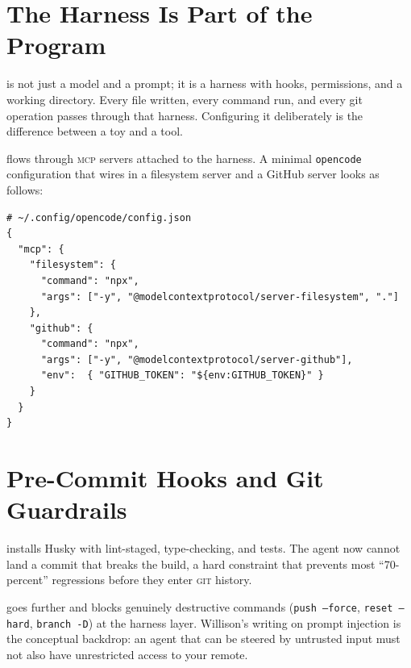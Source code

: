 \documentclass{../sharedAssets/tufte}
\begin{document}
\section{The Harness Is Part of the Program}
\label{sec:harness}

 is not just a model and a prompt; it
is a harness with hooks, permissions, and a working directory. Every
file written, every command run, and every git operation passes through
that harness. Configuring it deliberately is the difference between a
toy and a tool.

 flows through \textsc{mcp} servers attached to
the harness. A minimal \texttt{opencode} configuration that wires in a
filesystem server and a GitHub server looks as follows:

\begin{fullwidth}
\begin{verbatim}
# ~/.config/opencode/config.json
{
  "mcp": {
    "filesystem": {
      "command": "npx",
      "args": ["-y", "@modelcontextprotocol/server-filesystem", "."]
    },
    "github": {
      "command": "npx",
      "args": ["-y", "@modelcontextprotocol/server-github"],
      "env":  { "GITHUB_TOKEN": "${env:GITHUB_TOKEN}" }
    }
  }
}
\end{verbatim}
\end{fullwidth}


\section{Pre-Commit Hooks and Git Guardrails}
\label{sec:guardrails}

 installs Husky with lint-staged,
type-checking, and tests. The agent now cannot land a commit that
breaks the build, a hard constraint that prevents most ``70-percent''
regressions before they enter \textsc{git} history.

 goes further and blocks
genuinely destructive commands (\texttt{push --force},
\texttt{reset --hard}, \texttt{branch -D}) at the harness layer.
Willison's writing on prompt injection\cite{willison2024injection}
is the conceptual backdrop: an agent that can be steered by untrusted
input must not also have unrestricted access to your remote.
\end{document}
